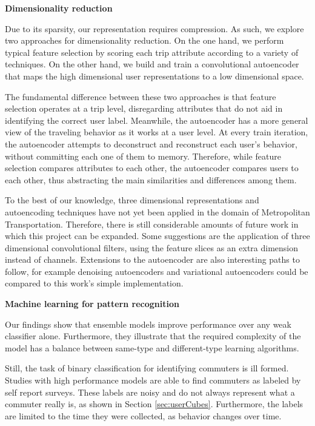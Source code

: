 \documentclass{article}
\begin{document}
\textbf{Dimensionality reduction}

Due to its sparsity, our representation requires compression. As such, we explore two approaches for dimensionality reduction. On the one hand, we perform typical feature selection by scoring each trip attribute according to a variety of techniques. On the other hand, we build and train a convolutional autoencoder that maps the high dimensional user representations to a low dimensional space. 

The fundamental difference between these two approaches is that feature selection operates at a trip level, disregarding attributes that do not aid in identifying the correct user label. Meanwhile, the autoencoder has a more general view of the traveling behavior as it works at a user level. At every train iteration, the autoencoder attempts to deconstruct and reconstruct each user's behavior, without committing each one of them to memory. Therefore, while feature selection compares attributes to each other, the autoencoder compares users to each other, thus abstracting the main similarities and differences among them.

To the best of our knowledge, three dimensional representations and autoencoding techniques have not yet been applied in the domain of Metropolitan Transportation. Therefore, there is still considerable amounts of future work in which this project can be expanded. Some suggestions are the application of three dimensional convolutional filters, using the feature slices as an extra dimension instead of channels. Extensions to the autoencoder are also interesting paths to follow, for example denoising autoencoders and variational autoencoders could be compared to this work's simple implementation.

\textbf{Machine learning for pattern recognition}

Our findings show that ensemble models improve performance over any weak classifier alone. Furthermore, they illustrate that the required complexity of the model has a balance between same-type and different-type learning algorithms. 

Still, the task of binary classification for identifying commuters is ill formed. Studies with high performance models are able to find commuters as labeled by self report surveys. These labels are noisy and do not always represent what a commuter really is, as shown in Section \ref{sec:userCubes}. Furthermore, the labels are limited to the time they were collected, as behavior changes over time.  
\end{document}

